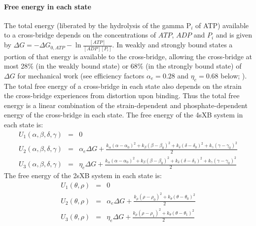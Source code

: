 \documentclass[]{article}
\begin{document}
\paragraph{Free energy in each state} %
The total energy (liberated by the hydrolysis of the gamma P$_i$ of ATP) available to a cross-bridge depends on the concentrations of $ATP$, $ADP$ and $P_i$ and is given by $\Delta G = -\Delta G_{0,ATP} - \ln \frac{[ATP]}{[ADP] [P_i]}$. 
In weakly and strongly bound states a portion of that energy is available to the cross-bridge, allowing the cross-bridge at most 28\% (in the weakly bound state) or 68\% (in the strongly bound state) of $\Delta G$ for mechanical work (see efficiency factors $\alpha_e=0.28$ and $\eta_e=0.68$ below; \citet{Pate1989, Tanner2007}).
The total free energy of a cross-bridge in each state also depends on the strain the cross-bridge experiences from distortion upon binding.
Thus the total free energy is a linear combination of the strain-dependent and phosphate-dependent energy of the cross-bridge in each state.
The free energy of the 4sXB system in each state is: 
\begin{eqnarray*}
\label{4sEnergy}
U_1(\alpha, \beta, \delta, \gamma) & = & 0 \\
U_2(\alpha, \beta, \delta, \gamma) & = & \alpha_e \Delta G + \frac{k_\alpha (\alpha-\alpha_0)^2 + k_\beta (\beta-\beta_0)^2 + k_\delta (\delta-\delta_0)^2 + k_\gamma (\gamma-\gamma_0)^2}{2} \\
U_3(\alpha, \beta, \delta, \gamma) & = & \eta_e \Delta G + \frac{k_\alpha (\alpha-\alpha_0)^2 + k_\beta (\beta-\beta_0)^2 + k_\delta (\delta-\delta_1)^2 + k_\gamma (\gamma-\gamma_0)^2}{2} 
\end{eqnarray*}
The free energy of the 2sXB system in each state is: 
\begin{eqnarray*}
\label{2sEnergy}
	U_1(\theta, \rho) & = & 0 \\
    U_2(\theta, \rho) & = & \alpha_e \Delta G + \frac{k_\rho (\rho - \rho_0)^2 + 
                          k_\theta (\theta - \theta_0)^2}{2} \\
    U_3(\theta, \rho) & = & \eta_e \Delta G   + \frac{k_\rho (\rho - \rho_1)^2 + 
                          k_\theta (\theta - \theta_1)^2}{2} 
\end{eqnarray*}
\end{document}

